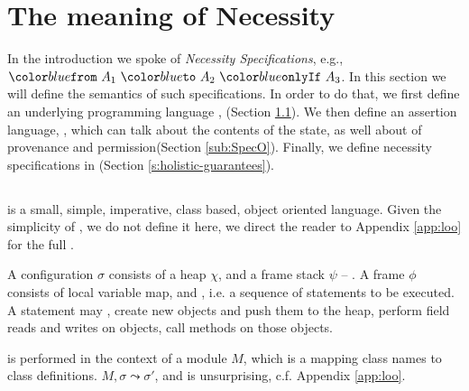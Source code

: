 \section{The meaning of Necessity}
\label{s:semantics}

In the introduction we spoke of \emph{Necessity Specifications}, e.g., $\onlyIf {A_1} {A_2} {A_3}$. 
In this section we will define the semantics of such specifications.
In order to do that, we first define 
an underlying programming language \Loo, (Section \ref{sub:Loo}).
We then  define an assertion language, \SpecO,  which can talk about
 the contents of the state, as well about 
  of provenance and permission(Section \ref{sub:SpecO}).
Finally, we define necessity specifications in \Chainmail (Section \ref{s:holistic-guarantees}).



\subsection{\Loo}
\label{sub:Loo} 
 \Loo is a small, simple, imperative,
class based, object oriented language. 
Given the simplicity of \Loo, we do not
define it here,  we direct the reader to Appendix \ref{app:loo} for 
the full . %

A \Loo configuration $\sigma$ consists of a 
heap $\chi$, and a frame stack $\psi$ --
.    
A frame $\phi$ consists of
local variable map, and , i.e. a sequence of statements to be executed.
 A statement may , create new objects and push them to the heap, 
perform field reads and writes on objects,  
 call methods on those objects. 

 is performed in the context of a module $M$,
which is a mapping
 class names to class definitions. 
  $M, \sigma \leadsto \sigma'$, and is
unsurprising,  c.f. Appendix \ref{app:loo}.
 

